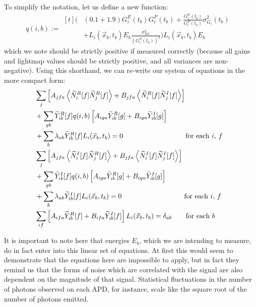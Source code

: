 To simplify the notation, let us define a new function:
\begin{equation} \label{eqn:DefinitionOfQ}
q(i,b) := \begin{aligned}[t]
  \bigg( &(0.1 + 1.9) G^E_i(t_b) G^P_i(t_b) + \frac{G^E_i(t_b)}{G^P_i(t_b)} \sigma^2_{G_i}(t_b)\\
  &+ L_i(\vec{x}_b,t_b) E_b \frac{\sigma^2_{NU}}{\left(G^P_i(t_b)\right)^2}\bigg)L_i(\vec{x}_b, t_b) E_b
\end{aligned}
\end{equation}
which we note should be strictly positive if measured correctly (because all gains and lightmap values should be strictly positive, and all variances are non-negative).  Using this shorthand, we can re-write our system of equations in the more compact form:
\begin{subequations} \label{eqn:SystemToSolve} \begin{align}
&\sum_j \left[ A_{jfa} \left<\widetilde{N}_i^R[f]\widetilde{N}_j^R[f]\right> + B_{jfa} \left<\widetilde{N}_i^R[f]\widetilde{N}_j^I[f]\right>\right] \notag \\
&+ \sum_{gb} \widetilde{Y}_{ib}^R[f] q(i,b) \left[A_{iga} \widetilde{Y}_{ib}^R[g] + B_{iga} \widetilde{Y}_{ib}^I[g]\right] \notag \\
&+ \sum_b \lambda_{ab} \widetilde{Y}^R_{ib}[f] L_i(\vec{x}_b,t_b) = 0 \qquad \qquad \qquad \qquad \quad \text{for each $i$, $f$}\\
%
&\sum_j \left[ A_{jfa} \left<\widetilde{N}_i^I[f]\widetilde{N}_j^R[f]\right> + B_{jfa} \left<\widetilde{N}_i^I[f]\widetilde{N}_j^I[f]\right>\right] \notag \\
&+ \sum_{gb} \widetilde{Y}_{ib}^I[f] q(i,b) \left[A_{iga} \widetilde{Y}_{ib}^R[g] + B_{iga} \widetilde{Y}_{ib}^I[g]\right] \notag \\
&+ \sum_b \lambda_{ab} \widetilde{Y}^I_{ib}[f] L_i(\vec{x}_b,t_b) = 0 \qquad \qquad \qquad \qquad \quad \text{for each $i$, $f$}\\
%
&\sum_{if}\left[A_{ifa} \widetilde{Y}_{ib}^R[f] + B_{ifa} \widetilde{Y}_{ib}^I[f]\right] L_i(\vec{x}_b,t_b) = \delta_{ab} \qquad \text{for each $b$}
\end{align} \end{subequations}

It is important to note here that energies $E_b$, which we are intending to measure, do in fact enter into this linear set of equations.  At first this would seem to demonstrate that the equations here are impossible to apply, but in fact they remind us that the forms of noise which are correlated with the signal are also dependent on the magnitude of that signal.  Statistical fluctuations in the number of photons observed on each APD, for instance, scale like the square root of the number of photons emitted.

